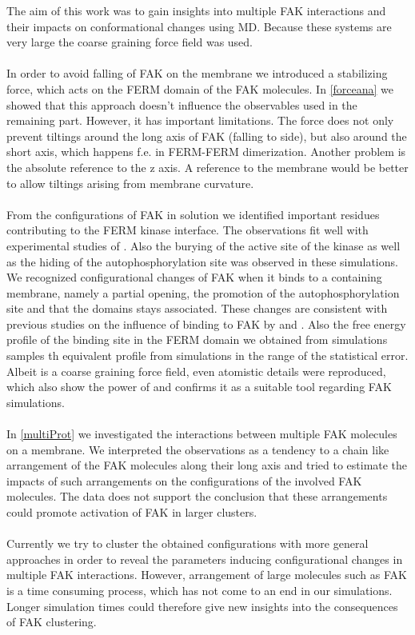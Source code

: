The aim of this work was to gain insights into multiple FAK interactions and their impacts on conformational changes using MD. Because these systems are very large the coarse graining force field \martini{} was used.\\
\\
In order to avoid falling of FAK on the membrane we introduced a stabilizing force, which acts on the FERM domain of the FAK molecules. In \autoref{forceana} we showed that this approach doesn't influence the observables used in the remaining part. However, it has important limitations. The force does not only prevent tiltings around the long axis of FAK (falling to side), but also around the short axis, which happens f.e. in FERM-FERM dimerization. Another problem is the absolute reference to the z axis. A reference to the membrane would be better to allow tiltings arising from membrane curvature.\\ %
\\
From the configurations of FAK in solution we identified important residues contributing to the FERM kinase interface. The observations fit well with experimental studies of \textcite{structFAK}. Also the burying of the active site of the kinase as well as the hiding of the autophosphorylation site was observed in these simulations.\\
We recognized configurational changes of FAK when it binds to a \pip{} containing membrane, namely a partial opening, the promotion of the autophosphorylation site and that the domains stays associated. These changes are consistent with previous studies on the influence of \pip{} binding to FAK by \textcite{pap001} and \textcite{pap003}. Also the free energy profile of the \pip{} binding site in the FERM domain we obtained from \martini{} simulations samples th equivalent profile from \charmm{} simulations in the range of the statistical error.\\
Albeit \martini{} is a coarse graining force field, even atomistic details were reproduced, which also show the power of \martini{} and confirms it as a suitable tool regarding FAK simulations.\\
\\
In \autoref{multiProt} we investigated the interactions between multiple FAK molecules on a membrane. We interpreted the observations as a tendency to a chain like arrangement of the FAK molecules along their long axis and tried to estimate the impacts of such arrangements on the configurations of the involved FAK molecules. The data does not support the conclusion that these arrangements could promote activation of FAK in larger clusters.\\
\\
Currently we try to cluster the obtained configurations with more general approaches in order to reveal the parameters inducing configurational changes in multiple FAK interactions. However, arrangement of large molecules such as FAK is a time consuming process, which has not come to an end in our simulations. Longer simulation times could therefore give new insights into the consequences of FAK clustering. 